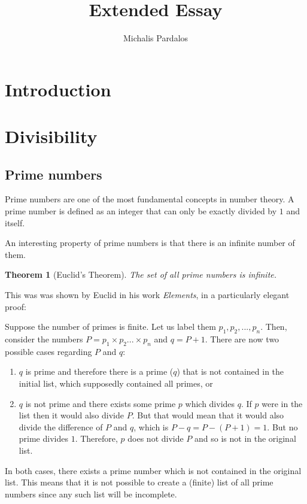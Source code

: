 \documentclass[12pt]{article}
\title{Extended Essay}
\author{Michalis Pardalos}
\newtheorem{theorem}{Theorem}
\begin{document}
\maketitle

\tableofcontents

\section{Introduction}

\section{Divisibility}
    \subsection{Prime numbers}
    Prime numbers are one of the most fundamental concepts in number theory. A
    prime number is defined as an integer that can only be exactly divided by
    $1$ and itself.

    An interesting property of prime numbers is that there is an infinite number
    of them. 
    \begin{theorem}[Euclid's Theorem]
        The set of all prime numbers is infinite.
    \end{theorem}
%
    This was was shown by Euclid in his work \emph{Elements}, in a
    particularly elegant proof:

    Suppose the number of primes is finite. Let us label them $p_1, p_2, ...,
    p_n$. Then, consider the numbers $P = p_1\times p_2 ... \times p_n$ and 
    $q = P + 1$. There are now two possible cases regarding $P$ and $q$:
    \begin{enumerate}[label=\alph*)]
        \item $q$ is prime and therefore there is a prime ($q$) that is not
            contained in the initial list, which supposedly contained all
            primes, or
        \item $q$ is not prime and there exists some prime $p$ which divides
            $q$. If $p$ were in the list then it would also divide $P$. But that
            would mean that it would also divide the difference of $P$ and $q$,
            which is $P - q = P - (P + 1) = 1$. But no prime divides $1$.
            Therefore, $p$ does not divide $P$ and so is not in the original
            list.
    \end{enumerate}
    In both cases, there exists a prime number which is not contained in the
    original list. This means that it is not possible to create a (finite) list
    of all prime numbers since any such list will be incomplete.
        
\end{document}
